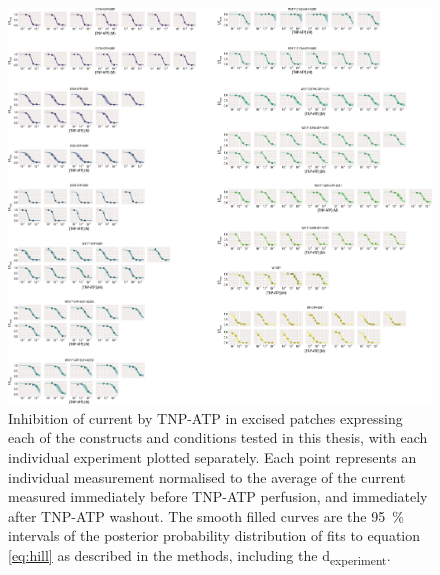 \begin{figure}[h]
	\centering
	\includegraphics[width=\textwidth]{all_tnpatp_fits_2.pdf}
	\caption[TNP-ATP inhibition sample hill fits]{
	Inhibition of current by TNP-ATP in excised patches expressing each of the constructs and conditions tested in this thesis, with each individual experiment plotted separately.
	Each point represents an individual measurement normalised to the average of the current measured immediately before TNP-ATP perfusion, and immediately after TNP-ATP washout.
	The smooth filled curves are the \SI{95}{\percent} intervals of the posterior probability distribution of fits to equation \ref{eq:hill} as described in the methods, including the \textgreek{d}\textsubscript{experiment}.
	}
	\label{apxfig:tnpatp_inhib_2}
\end{figure}

